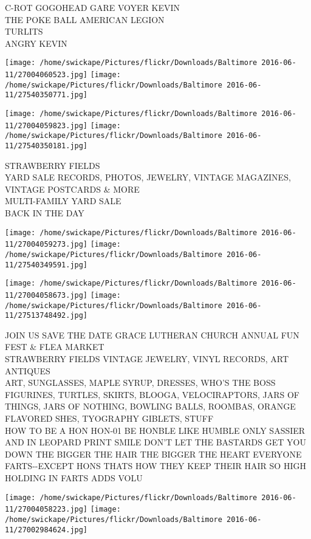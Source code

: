 \documentclass[10pt,letterpaper]{article}
\begin{document}
C{-}ROT GOGOHEAD GARE VOYER KEVIN\\
THE POKE BALL AMERICAN LEGION\\
TURLITS\\
ANGRY KEVIN\\
\pagebreak

\texttt{[image: /home/swickape/Pictures/flickr/Downloads/Baltimore 2016-06-11/27004060523.jpg]}
\texttt{[image: /home/swickape/Pictures/flickr/Downloads/Baltimore 2016-06-11/27540350771.jpg]}

\texttt{[image: /home/swickape/Pictures/flickr/Downloads/Baltimore 2016-06-11/27004059823.jpg]}
\texttt{[image: /home/swickape/Pictures/flickr/Downloads/Baltimore 2016-06-11/27540350181.jpg]}

STRAWBERRY FIELDS\\
YARD SALE RECORDS, PHOTOS, JEWELRY, VINTAGE MAGAZINES, VINTAGE POSTCARDS \& MORE\\
MULTI{-}FAMILY YARD SALE\\
BACK IN THE DAY\\
\pagebreak

\texttt{[image: /home/swickape/Pictures/flickr/Downloads/Baltimore 2016-06-11/27004059273.jpg]}
\texttt{[image: /home/swickape/Pictures/flickr/Downloads/Baltimore 2016-06-11/27540349591.jpg]}

\texttt{[image: /home/swickape/Pictures/flickr/Downloads/Baltimore 2016-06-11/27004058673.jpg]}
\texttt{[image: /home/swickape/Pictures/flickr/Downloads/Baltimore 2016-06-11/27513748492.jpg]}

JOIN US SAVE THE DATE GRACE LUTHERAN CHURCH ANNUAL FUN FEST \& FLEA MARKET\\
STRAWBERRY FIELDS VINTAGE JEWELRY, VINYL RECORDS, ART ANTIQUES\\
ART, SUNGLASSES, MAPLE SYRUP, DRESSES, WHO'S THE BOSS FIGURINES, TURTLES, SKIRTS, BLOOGA, VELOCIRAPTORS, JARS OF THINGS, JARS OF NOTHING, BOWLING BALLS, ROOMBAS, ORANGE FLAVORED SHES, TYOGRAPHY GIBLETS, STUFF\\
HOW TO BE A HON HON{-}01 BE HONBLE LIKE HUMBLE ONLY SASSIER AND IN LEOPARD PRINT SMILE DON'T LET THE BASTARDS GET YOU DOWN THE BIGGER THE HAIR THE BIGGER THE HEART EVERYONE FARTS{-}{-}EXCEPT HONS THATS HOW THEY KEEP THEIR HAIR SO HIGH HOLDING IN FARTS ADDS VOLU\\
\pagebreak

\texttt{[image: /home/swickape/Pictures/flickr/Downloads/Baltimore 2016-06-11/27004058223.jpg]}
\texttt{[image: /home/swickape/Pictures/flickr/Downloads/Baltimore 2016-06-11/27002984624.jpg]}
\end{document}
